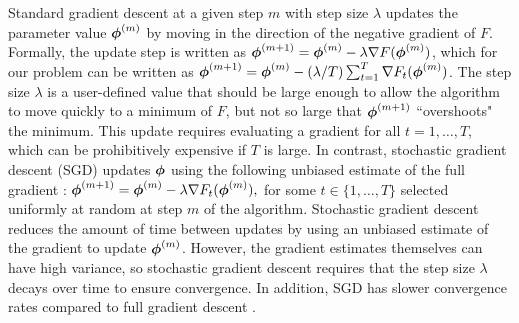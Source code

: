 Standard gradient descent at a given step $m$ with step size $\lambda$ updates the parameter value $\boldsymbol{\phi}^{(m)}$ by moving in the direction of the negative gradient of $F$. Formally, the update step is written as
%
    $\boldsymbol{\phi}^{(m+1)} = \boldsymbol{\phi}^{(m)} - \lambda \nabla F(\boldsymbol{\phi}^{(m)})$, which for our problem can be written as $\boldsymbol{\phi}^{(m+1)} = \boldsymbol{\phi}^{(m)} - (\lambda/T) \sum_{t=1}^T \nabla F_t(\boldsymbol{\phi}^{(m)})$.
%
The step size $\lambda$ is a user-defined value that should be large enough to allow the algorithm to move quickly to a minimum of $F$, but not so large that $\boldsymbol{\phi}^{(m+1)}$ ``overshoots" the minimum. This update requires evaluating a gradient for all $t = 1,\ldots,T$, which can be prohibitively expensive if $T$ is large. In contrast, stochastic gradient descent (SGD) updates $\boldsymbol{\phi}$ using the following unbiased estimate of the full gradient \citep{Robbins:1951}:
%
$\boldsymbol{\phi}^{(m+1)} = \boldsymbol{\phi}^{(m)} - \lambda \nabla F_{t}(\boldsymbol{\phi}^{(m)}),$
%
for some $t \in \{1,\ldots,T\}$ selected uniformly at random at step $m$ of the algorithm. Stochastic gradient descent reduces the amount of time between updates by using an unbiased estimate of the gradient to update $\boldsymbol{\phi}^{(m)}$. However, the gradient estimates themselves can have high variance, so stochastic gradient descent requires that the step size $\lambda$ decays over time to ensure convergence. In addition, SGD has slower convergence rates compared to full gradient descent \citep{Schmidt:2017}.

